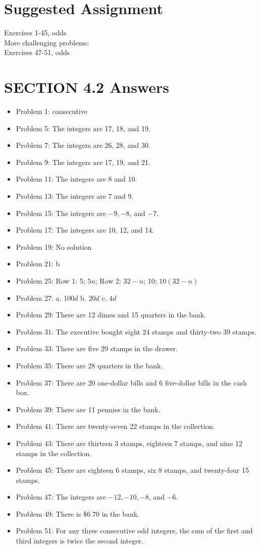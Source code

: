 \documentclass{ximera}
\begin{document}
\section*{Suggested Assignment}
Exercises 1-45, odds\\
More challenging problems:\\
Exercises 47-51, odds

\section*{SECTION 4.2 Answers}
\begin{itemize}
  \item Problem 1: consecutive
  \item Problem 5: The integers are 17, 18, and 19.
  \item Problem 7: The integers are 26, 28, and 30.
  \item Problem 9: The integers are 17, 19, and 21.
  \item Problem 11: The integers are 8 and 10.
  \item Problem 13: The integers are 7 and 9.
  \item Problem 15: The integers are $-9, -8$, and $-7$.
  \item Problem 17: The integers are 10, 12, and 14.
  \item Problem 19: No solution
  \item Problem 21: b
  \item Problem 25: Row 1: 5; $5n$; Row 2: $32-n$; 10; $10(32-n)$
  \item Problem 27: a. $100d$ \quad b. $20d$ \quad c. $4d$
  \item Problem 29: There are 12 dimes and 15 quarters in the bank.
  \item Problem 31: The executive bought eight 24\textcent{} stamps and thirty-two 39\textcent{} stamps.
  \item Problem 33: There are five 29\textcent{} stamps in the drawer.
  \item Problem 35: There are 28 quarters in the bank.
  \item Problem 37: There are 20 one-dollar bills and 6 five-dollar bills in the cash box.
  \item Problem 39: There are 11 pennies in the bank.
  \item Problem 41: There are twenty-seven 22\textcent{} stamps in the collection.
  \item Problem 43: There are thirteen 3\textcent{} stamps, eighteen 7\textcent{} stamps, and nine 12\textcent{} stamps in the collection.
  \item Problem 45: There are eighteen 6\textcent{} stamps, six 8\textcent{} stamps, and twenty-four 15\textcent{} stamps.
  \item Problem 47: The integers are $-12, -10, -8$, and $-6$.
  \item Problem 49: There is $\$6.70$ in the bank.
  \item Problem 51: For any three consecutive odd integers, the sum of the first and third integers is twice the second integer.
\end{itemize}
\end{document}
